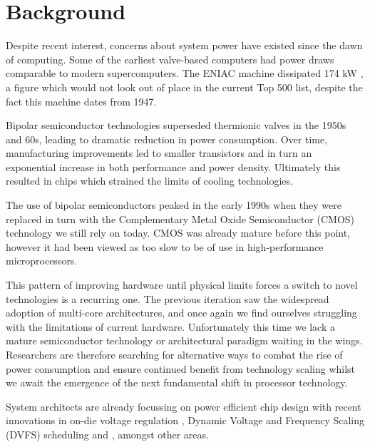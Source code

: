 \section{Background}
\label{sec:background}
Despite recent interest, concerns about system power have existed since the dawn of computing. Some of the earliest valve-based computers had power draws comparable to modern supercomputers. The ENIAC machine dissipated 174 kW \cite{birnbaum:2000aa}, a figure which would not look out of place in the current Top 500 list, despite the fact this machine dates from 1947.\golden

Bipolar semiconductor technologies superseded thermionic valves in the 1950s and 60s, leading to dramatic reduction in power consumption. Over time, manufacturing improvements led to smaller transistors and in turn an exponential increase in both performance and power density. Ultimately this resulted in chips which strained the limits of cooling technologies. \golden

The use of bipolar semiconductors peaked in the early 1990s when they were replaced in turn with the Complementary Metal Oxide Semiconductor (CMOS) technology we still rely on today. CMOS was already mature before this point, however it had been viewed as too slow to be of use in high-performance microprocessors. \golden



This pattern of improving hardware until physical limits forces a switch to novel technologies is a recurring one. The previous iteration saw the widespread adoption of multi-core architectures, and once again we find ourselves struggling with the limitations of current hardware. Unfortunately this time we lack a mature semiconductor technology or architectural paradigm waiting in the wings. Researchers are therefore searching for alternative ways to combat the rise of power consumption and ensure continued benefit from technology scaling whilst we await the emergence of the next fundamental shift in processor technology. \golden

System architects are already focussing on power efficient chip design with recent innovations in on-die voltage regulation \cite{burton:2014aa}, Dynamic Voltage and Frequency Scaling (DVFS) scheduling \cite{kwon:2013aa} and , amongst other areas.


